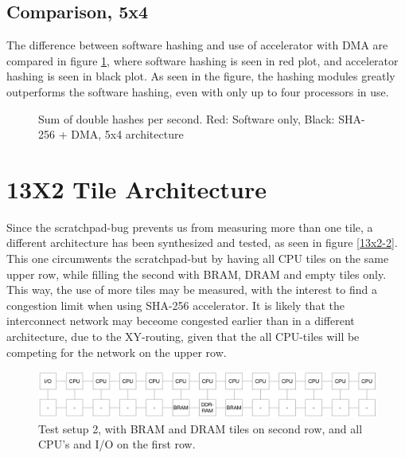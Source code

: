 \begin{appendix}
\subsection{Comparison, 5x4}

The difference between software hashing and use of accelerator with DMA are compared in figure \ref{fig:comp-plot1}, where software hashing is seen in red plot, and accelerator hashing is seen in black plot.
As seen in the figure, the hashing modules greatly outperforms the software hashing, even with only up to four processors in use.

\begin{figure}
	\caption{Sum of double hashes per second. Red: Software only, Black: SHA-256 + DMA, 5x4 architecture}
	\label{fig:comp-plot1}
\end{figure}

\section{13X2 Tile Architecture}

Since the scratchpad-bug prevents us from measuring more than one tile, a different architecture has been synthesized and tested, as seen in figure \ref{13x2-2}.
This one circumwents the scratchpad-but by having all CPU tiles on the same upper row, while filling the second with BRAM, DRAM and empty tiles only.
This way, the use of more tiles may be measured, with the interest to find a congestion limit when using SHA-256 accelerator.
It is likely that the interconnect network may beceome congested earlier than in a different architecture, due to the XY-routing, given that the all CPU-tiles will be competing for the network on the upper row.

\begin{figure}[htb]
    \centering
    \includegraphics[width=1.0\textwidth]{Figures/Measurements/13x2}
    \caption{Test setup 2, with BRAM and DRAM tiles on second row, and all CPU's and I/O on the first row.}
    \label{fig:13x2-2}
\end{figure}


\end{appendix}
